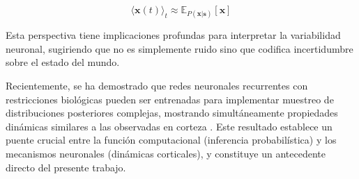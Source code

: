 \begin{equation}
\langle \mathbf{x}(t) \rangle_t \approx \mathbb{E}_{P(\mathbf{x}|\mathbf{s})}[\mathbf{x}]
\label{eq:neural_sampling}
\end{equation}

Esta perspectiva tiene implicaciones profundas para interpretar la variabilidad neuronal, sugiriendo que no es simplemente ruido sino que codifica incertidumbre sobre el estado del mundo.

Recientemente, se ha demostrado que redes neuronales recurrentes con restricciones biológicas pueden ser entrenadas para implementar muestreo de distribuciones posteriores complejas, mostrando simultáneamente propiedades dinámicas similares a las observadas en corteza \citep{echeveste2020cortical}. Este resultado establece un puente crucial entre la función computacional (inferencia probabilística) y los mecanismos neuronales (dinámicas corticales), y constituye un antecedente directo del presente trabajo.






